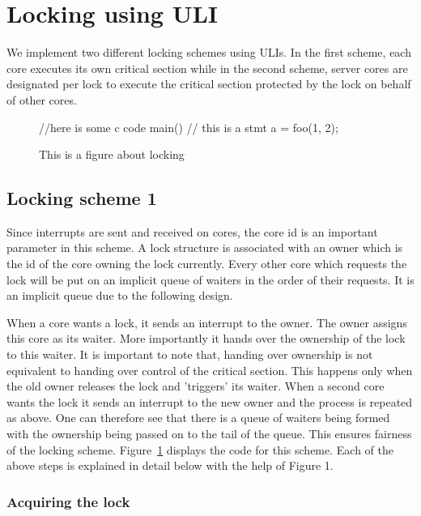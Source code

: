 \section{Locking using ULI}

We implement two different locking schemes using ULIs. In the first scheme, each
core executes its own critical section while in the second scheme, server cores
are designated per lock to execute the critical section protected by the lock on
behalf of other cores.

\begin{figure}
\begin{code}
//here is some c code
main() 
{
  // this is a stmt
  a = foo(1, 2);
}
\end{code}
\caption{This is a figure about locking\label{fig-locking}}
\end{figure}

\subsection{Locking scheme 1}

Since interrupts are sent and received on cores, the core id is an important
parameter in this scheme. A lock structure is associated with an owner which is
the id of the core owning the lock currently. Every other core which requests
the lock will be put on an implicit queue of waiters in the order of their
requests. It is an implicit queue due to the following design.

When a core wants a lock, it sends an interrupt to the owner. The owner assigns
this core as its waiter. More importantly it hands over the ownership of the
lock to this waiter. It is important to note that, handing over ownership is not
equivalent to handing over control of the critical section. This happens only
when the old owner releases the lock and 'triggers' its waiter. When a second
core wants the lock it sends an interrupt to the new owner and the process is
repeated as above. One can therefore see that there is a queue of waiters being
formed with the ownership being passed on to the tail of the queue. This ensures
fairness of the locking scheme. Figure~\ref{fig-locking} displays the code for this scheme. Each
of the above steps is explained in detail below with the help of Figure 1.

\subsubsection{Acquiring the lock}

